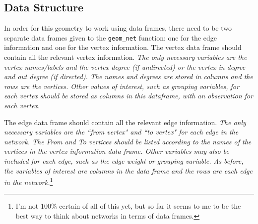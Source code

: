 \documentclass[11pt]{article}\usepackage[]{graphicx}\usepackage[]{color}
\begin{document}
  \subsection{Data Structure}
  In order for this geometry to work using data frames, there need to be two separate data frames given to the \texttt{geom\_net} function: one for the edge information and one for the vertex information. The vertex data frame should contain all the relevant vertex information. \emph{The only necessary variables are the vertex names/labels and the vertex degree (if undirected) or the vertex in degree and out degree (if directed).  The names and degrees are stored in columns and the rows are the vertices.  Other values of interest, such as grouping variables, for each vertex should be stored as columns in this dataframe, with an observation for each vertex.}  
  \par The edge data frame should contain all the relevant edge information.  \emph{The only necessary variables are the ``from vertex" and ``to vertex" for each edge in the network. The From and To vertices should be listed according to the names of the vertices in the vertex information data frame. Other variables may also be included for each edge, such as the edge weight or grouping variable.  As before, the variables of interest are columns in the data frame and the rows are each edge in the network.}\footnote{I'm not 100\% certain of all of this yet, but so far it seems to me to be the best way to think about networks in terms of data frames.}
\end{document}
